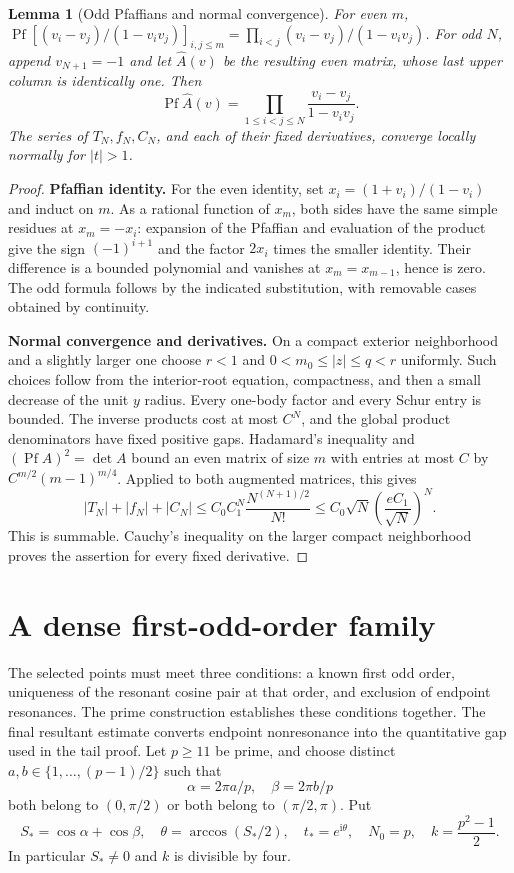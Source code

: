\documentclass[11pt]{article}
\numberwithin{equation}{section}
\newtheorem{lemma}[theorem]{Lemma}
\theoremstyle{definition}
\newcommand{\ii}{\mathrm i}
\newcommand{\Pf}{\operatorname{Pf}}
\begin{document}
\begin{lemma}[Odd Pfaffians and normal convergence]\label{lem:schur}
For even $m$,
$\Pf[(v_i-v_j)/(1-v_iv_j)]_{i,j\le m}
=\prod_{i<j}(v_i-v_j)/(1-v_iv_j)$.
For odd $N$, append $v_{N+1}=-1$ and let $\widehat A(v)$ be the
resulting even matrix, whose last upper column is identically one.
Then
\[
 \Pf\widehat A(v)=\prod_{1\le i<j\le N}\frac{v_i-v_j}{1-v_iv_j}.
\]
The series of $T_N,f_N,C_N$, and each of their fixed derivatives,
converge locally normally for $|t|>1$.
\end{lemma}
\begin{proof}
\noindent\textbf{Pfaffian identity.} For the even identity, set $x_i=(1+v_i)/(1-v_i)$ and induct on
$m$. As a rational function of $x_m$, both sides have the same
simple residues at $x_m=-x_i$: expansion of the Pfaffian and
evaluation of the product give the sign $(-1)^{i+1}$ and the
factor $2x_i$ times the smaller identity. Their difference is a
bounded polynomial and vanishes at $x_m=x_{m-1}$, hence is zero.
The odd formula follows by the indicated substitution, with
removable cases obtained by continuity.

\par\smallskip\noindent\textbf{Normal convergence and derivatives.} On a compact exterior neighborhood and a slightly larger one choose
$r<1$ and $0<m_0\le |z|\le q<r$ uniformly. Such choices follow
from the interior-root equation, compactness, and then a small
decrease of the unit $y$ radius. Every one-body factor and every
Schur entry is bounded. The inverse products cost at most $C^N$,
and the global product denominators have fixed positive gaps.
Hadamard's inequality and $(\Pf A)^2=\det A$ bound an even
matrix of size $m$ with entries at most $C$ by
$C^{m/2}(m-1)^{m/4}$. Applied to both augmented matrices, this gives
\[
 |T_N|+|f_N|+|C_N|
 \le C_0 C_1^N\frac{N^{(N+1)/2}}{N!}
 \le C_0\sqrt N\left(\frac{eC_1}{\sqrt N}\right)^N.
\]
This is summable. Cauchy's inequality on the larger compact
neighborhood proves the assertion for every fixed derivative.
\end{proof}

\section{A dense first-odd-order family}\label{sec:arithmetic}

The selected points must meet three conditions: a known first odd order,
uniqueness of the resonant cosine pair at that order, and exclusion of
endpoint resonances. The prime construction establishes these conditions
together. The final resultant estimate converts endpoint nonresonance
into the quantitative gap used in the tail proof.
Let $p\ge11$ be prime, and choose distinct
$a,b\in\{1,\ldots,(p-1)/2\}$ such that
\[
 \alpha=2\pi a/p,\quad\beta=2\pi b/p
\]
both belong to $(0,\pi/2)$ or both belong to $(\pi/2,\pi)$. Put
\[
 S_* =\cos\alpha+\cos\beta,
 \quad \theta=\arccos(S_*/2),\quad t_*=e^{\ii\theta},
 \quad N_0=p,\quad k=\frac{p^2-1}{2}.
\]
In particular $S_*\ne0$ and $k$ is divisible by four.
\end{document}
